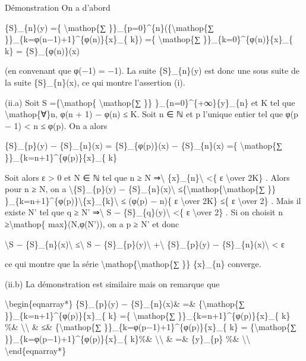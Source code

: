 \documentclass[]{article}
\begin{document}
Démonstration On a d'abord

\{S\}\_\{n\}(y) =\{ \textbackslash{}mathop\{∑
\}\}\_\{p=0\}\^{}\{n\}(\{\textbackslash{}mathop\{∑
\}\}\_\{k=φ(n−1)+1\}\^{}\{φ(n)\}\{x\}\_\{ k\}) =\{
\textbackslash{}mathop\{∑ \}\}\_\{k=0\}\^{}\{φ(n)\}\{x\}\_\{ k\} =
\{S\}\_\{φ(n)\}(x)

(en convenant que φ(−1) = −1). La suite \{S\}\_\{n\}(y) est donc une
sous suite de la suite \{S\}\_\{n\}(x), ce qui montre l'assertion (i).

(ii.a) Soit S =\{\textbackslash{}mathop\{ \textbackslash{}mathop\{∑ \}\}
\}\_\{n=0\}\^{}\{+∞\}\{y\}\_\{n\} et K tel que
\textbackslash{}mathop\{∀\}n, φ(n + 1) − φ(n) ≤ K. Soit n ∈ ℕ et p
l'unique entier tel que φ(p − 1) \textless{} n ≤ φ(p). On a alors

\{S\}\_\{p\}(y) − \{S\}\_\{n\}(x) = \{S\}\_\{φ(p)\}(x) − \{S\}\_\{n\}(x)
=\{ \textbackslash{}mathop\{∑ \}\}\_\{k=n+1\}\^{}\{φ(p)\}\{x\}\_\{ k\}

Soit alors ε \textgreater{} 0 et N ∈ ℕ tel que n ≥ N
⇒\textbackslash{}\textbar{} \{x\}\_\{n\}\textbackslash{}\textbar{}
\textless{}\{ ε \textbackslash{}over 2K\} . Alors pour n ≥ N, on a
\textbackslash{}\textbar{}\{S\}\_\{p\}(y) −
\{S\}\_\{n\}(x)\textbackslash{}\textbar{}
≤\{\textbackslash{}mathop\{\textbackslash{}mathop\{∑ \}\}
\}\_\{k=n+1\}\^{}\{φ(p)\}\textbackslash{}\textbar{}\{x\}\_\{k\}\textbackslash{}\textbar{}
≤ (φ(p) − n)\{ ε \textbackslash{}over 2K\} ≤\{ ε \textbackslash{}over
2\} . Mais il existe N' tel que q ≥ N' ⇒\textbackslash{}\textbar{} S −
\{S\}\_\{q\}(y)\textbackslash{}\textbar{} \textless{}\{ ε
\textbackslash{}over 2\} . Si on choisit n ≥\textbackslash{}mathop\{
max\}(N,φ(N')), on a p ≥ N' et donc

\textbackslash{}\textbar{}S − \{S\}\_\{n\}(x)\textbackslash{}\textbar{}
≤\textbackslash{}\textbar{} S −
\{S\}\_\{p\}(y)\textbackslash{}\textbar{} +\textbackslash{}\textbar{}
\{S\}\_\{p\}(y) − \{S\}\_\{n\}(x)\textbackslash{}\textbar{} \textless{}
ε

ce qui montre que la série
\textbackslash{}mathop\{\textbackslash{}mathop\{∑ \}\} \{x\}\_\{n\}
converge.

(ii.b) La démonstration est similaire mais on remarque que

\textbackslash{}begin\{eqnarray*\} \textbar{}\{S\}\_\{p\}(y) −
\{S\}\_\{n\}(x)\textbar{}\& =\& \textbar{}\{\textbackslash{}mathop\{∑
\}\}\_\{k=n+1\}\^{}\{φ(p)\}\{x\}\_\{ k\}\textbar{} =\{
\textbackslash{}mathop\{∑ \}\}\_\{k=n+1\}\^{}\{φ(p)\}\textbar{}\{x\}\_\{
k\}\textbar{} \%\& \textbackslash{}\textbackslash{} \& ≤\&
\{\textbackslash{}mathop\{∑
\}\}\_\{k=φ(p−1)+1\}\^{}\{φ(p)\}\textbar{}\{x\}\_\{ k\}\textbar{} =
\textbar{}\{\textbackslash{}mathop\{∑
\}\}\_\{k=φ(p−1)+1\}\^{}\{φ(p)\}\{x\}\_\{ k\}\textbar{}\%\&
\textbackslash{}\textbackslash{} \& =\& \textbar{}\{y\}\_\{p\}\textbar{}
\%\& \textbackslash{}\textbackslash{} \textbackslash{}end\{eqnarray*\}
\end{document}
